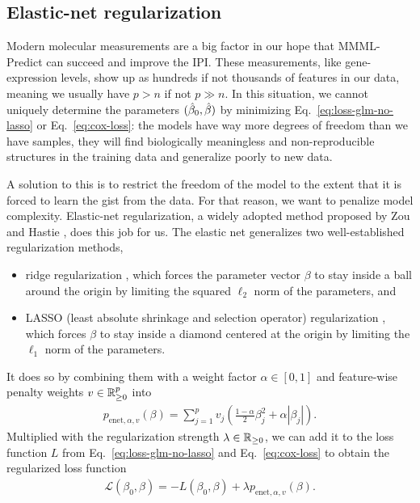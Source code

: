 \subsection{Elastic-net regularization} \label{subsec:elastic-net}

Modern molecular measurements are a big factor in our hope that MMML-Predict can succeed and improve 
the IPI. These measurements, like gene-expression levels, show up as hundreds if not thousands of 
features in our data, meaning we usually have $p > n$ if not $p \gg n$. In this situation, we 
cannot uniquely determine the parameters $(\hat{\beta}_0, \hat{\beta})$ by minimizing 
Eq.\ \eqref{eq:loss-glm-no-lasso} or Eq.\ \eqref{eq:cox-loss}:
the models have way more degrees of freedom than we have samples, they will find biologically 
meaningless and non-reproducible structures in the training data and generalize poorly to new 
data.

A solution to this is to restrict the freedom of the model to the extent that it is forced to 
learn the gist from the data. For that reason, we want to penalize model complexity. Elastic-net 
regularization, a widely adopted method proposed by Zou and Hastie \cite{elasticnet05}, does this 
job for us. The elastic net generalizes two well-established regularization methods,
\begin{itemize}
    \item ridge regularization \cite{ridge70}, which forces the parameter vector $\beta$ to 
        stay inside a ball around the origin by limiting the squared $\ell_2$ norm 
        of the parameters, and 
    \item LASSO (least absolute shrinkage and selection operator) regularization \cite{lasso18}, 
        which forces $\beta$ to stay inside a diamond centered at the origin by limiting the 
        $\ell_1$ norm of the parameters.
\end{itemize}
It does so by combining them with a weight factor $\alpha \in [0, 1]$ and feature-wise penalty 
weights $v \in \mathbb{R}_{\geq 0}^p$ into
\begin{align}\label{eq:enet-weights}
    p_{\text{enet}, \alpha, v}(\beta) = \sum_{j=1}^p v_j \left( \frac{1-\alpha}{2} \beta_j^2 +
    \alpha |\beta_j| \right).
\end{align}
Multiplied with the regularization strength $\lambda \in \mathbb{R}_{\geq 0}$, we can add it to the loss 
function $L$ from Eq.\ \eqref{eq:loss-glm-no-lasso} and Eq.\ \eqref{eq:cox-loss} to obtain the 
regularized loss function
\begin{align}\label{eq:loss-elastic-net}
    \mathcal{L}(\beta_0, \beta) = -L(\beta_0, \beta) + \lambda p_{\text{enet}, \alpha, v}(\beta).
\end{align}

